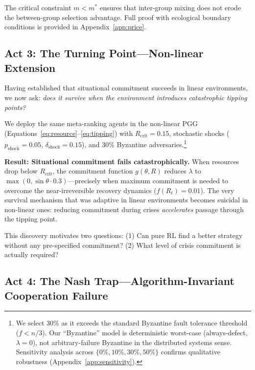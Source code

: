\documentclass{article}
\begin{document}
\noindent The critical constraint $m < m^*$ ensures that inter-group mixing does not erode the between-group selection advantage.
Full proof with ecological boundary conditions is provided in Appendix~\ref{app:price}.

\subsection{Act 3: The Turning Point---Non-linear Extension}
\label{sec:turning_point}

Having established that situational commitment succeeds in linear environments, we now ask: \emph{does it survive when the environment introduces catastrophic tipping points?}

We deploy the same meta-ranking agents in the non-linear PGG (Equations~\ref{eq:resource}--\ref{eq:tipping}) with $R_{\text{crit}} = 0.15$, stochastic shocks ($p_{\text{shock}} = 0.05$, $\delta_{\text{shock}} = 0.15$), and 30\% Byzantine adversaries.\footnote{We select 30\% as it exceeds the standard Byzantine fault tolerance threshold ($f < n/3$). Our ``Byzantine'' model is deterministic worst-case (always-defect, $\lambda{=}0$), not arbitrary-failure Byzantine in the distributed systems sense. Sensitivity analysis across $\{0\%, 10\%, 30\%, 50\%\}$ confirms qualitative robustness (Appendix~\ref{app:sensitivity}).}

\textbf{Result: Situational commitment fails catastrophically.}
When resources drop below $R_{\text{crit}}$, the commitment function $g(\theta, R)$ reduces $\lambda$ to $\max(0, \sin\theta \cdot 0.3)$---precisely when maximum commitment is needed to overcome the near-irreversible recovery dynamics ($f(R_t) = 0.01$).
The very survival mechanism that was adaptive in linear environments becomes suicidal in non-linear ones: reducing commitment during crises \emph{accelerates} passage through the tipping point.

This discovery motivates two questions: (1) Can pure RL find a better strategy without any pre-specified commitment? (2) What level of crisis commitment is actually required?

\subsection{Act 4: The Nash Trap---Algorithm-Invariant Cooperation Failure}
\label{sec:nash_trap}
\end{document}

